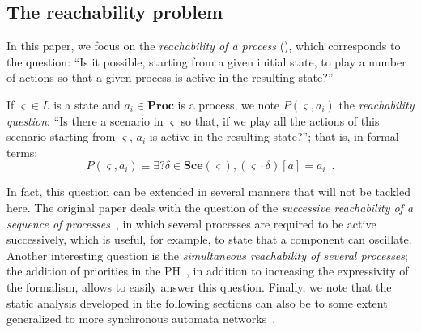\documentclass{movep}
\def\pref{\prettyref}
\newcommand{\PHl}{L}
\newcommand{\Proc}{\mathbf{Proc}}
\def\play{\cdot}
\def\Sce{\mathbf{Sce}}
\def\ctx{\varsigma}
\newcommand{\Pcai}{P(\ctx, a_i)}
\def\PHget#1#2{{#1[#2]}}
\def\ctx{\varsigma}
\newcounter{la}
\begin{document}
\subsection{The reachability problem}
\label{sec:reachability}


In this paper, we focus on the \emph{reachability of a process}
(\pref{def:reachability}),
which corresponds to the question:
“Is it possible, starting from a given initial state, to play a number of actions
so that a given process is active in the resulting state?”

\begin{definition}
\label{def:reachability}
  If $\ctx \in \PHl$ is a state and $a_i \in \Proc$ is a process,
  we note $\Pcai$ the \emph{reachability question}:
  “Is there a scenario in $\ctx$ so that,
  if we play all the actions of this scenario starting from $\ctx$,
  $a_i$ is active in the resulting state?”;
  that is, in formal terms:
  \[\Pcai \equiv \exists? \delta \in \Sce(\ctx), \PHget{(\ctx \play \delta)}{a} = a_i \enspace.\]
\end{definition}

In fact, this question can be extended in several manners that will not be tackled here.
The original paper deals with the question of the
\emph{successive reachability of a sequence of processes}~\cite{PMR12-MSCS},
in which several processes are required to be active successively,
which is useful, for example, to state that a component can oscillate.
Another interesting question %
is the \emph{simultaneous reachability of several processes};
the addition of priorities in the PH~\cite{FPMR13-CS2Bio},
in addition to increasing the expressivity of the formalism,
allows to easily answer this question.
Finally, we note that the static analysis developed in the following sections
can also be to some extent generalized to more synchronous automata networks~\cite{PAK13-CAV}.
\end{document}
